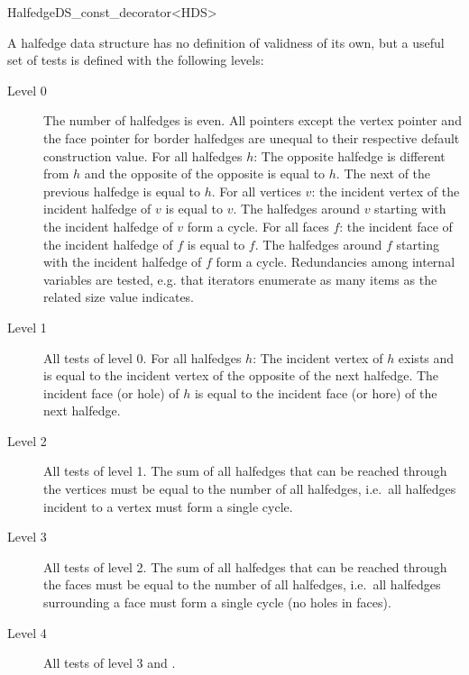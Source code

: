 \begin{ccRefClass}{HalfedgeDS_const_decorator<HDS>}

A halfedge data structure has no definition of validness of its own,
but a useful set of tests is defined with the following levels:
%
\begin{description}
\item[Level 0] 
  The number of halfedges is even. All pointers except
  the vertex pointer and the face pointer for border halfedges are
  unequal to their respective default construction value.  For all
  halfedges $h$: The opposite halfedge is different from $h$ and the
  opposite of the opposite is equal to $h$. The next of the previous
  halfedge is equal to $h$. For all vertices $v$: the incident vertex
  of the incident halfedge of $v$ is equal to $v$. The halfedges
  around $v$ starting with the incident halfedge of $v$ form a cycle.
  For all faces $f$: the incident face of the incident halfedge of $f$
  is equal to $f$. The halfedges around $f$ starting with the incident
  halfedge of $f$ form a cycle.  Redundancies among internal variables
  are tested, e.g. that iterators enumerate as many items as the
  related size value indicates.
\item[Level 1] 
  All tests of level 0. For all halfedges $h$: The
  incident vertex of $h$ exists and is equal to the incident vertex of
  the opposite of the next halfedge. The incident face (or hole) of
  $h$ is equal to the incident face (or hore) of the next halfedge.
\item[Level 2]
  All tests of level 1. The sum of all halfedges that can
  be reached through the vertices must be equal to the number of all
  halfedges, i.e.~all halfedges incident to a vertex must form a single
  cycle.
\item[Level 3]
  All tests of level 2. The sum of all halfedges that can
  be reached through the faces must be equal to the number of all
  halfedges, i.e.~all halfedges surrounding a face must form a single
  cycle (no holes in faces).
\item[Level 4]
  All tests of level 3 and .
\end{description}



\end{ccRefClass}
